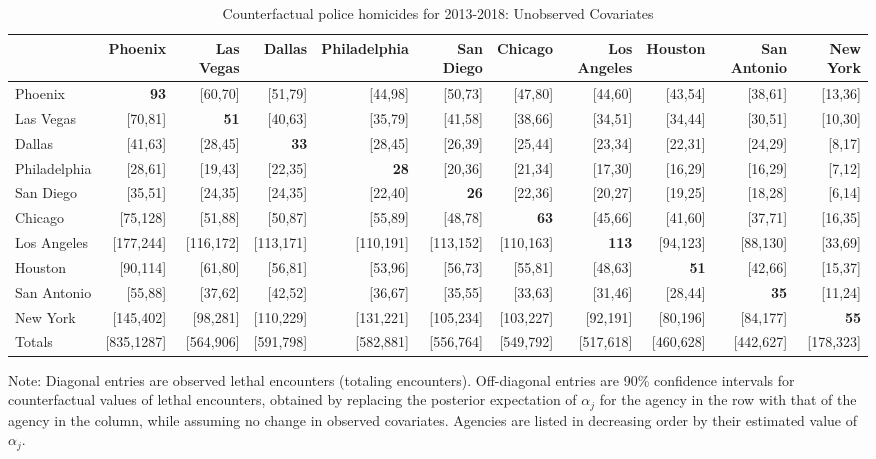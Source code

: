 \begin{table}[h!]\centering\scriptsize\tabcolsep=0.1cm\caption{Counterfactual police homicides for 2013-2018: Unobserved Covariates} \label{table:bootstrap_counterfactual_unobs}\begin{tabular}{lrrrrrrrrrr}\hline \hline&Phoenix&Las Vegas&Dallas&Philadelphia&San Diego&Chicago&Los Angeles&Houston&San Antonio&New York\\
\hline
Phoenix&\textbf{93}&[60,70]&[51,79]&[44,98]&[50,73]&[47,80]&[44,60]&[43,54]&[38,61]&[13,36]\\
Las Vegas&[70,81]&\textbf{51}&[40,63]&[35,79]&[41,58]&[38,66]&[34,51]&[34,44]&[30,51]&[10,30]\\
Dallas&[41,63]&[28,45]&\textbf{33}&[28,45]&[26,39]&[25,44]&[23,34]&[22,31]&[24,29]&[8,17]\\
Philadelphia&[28,61]&[19,43]&[22,35]&\textbf{28}&[20,36]&[21,34]&[17,30]&[16,29]&[16,29]&[7,12]\\
San Diego&[35,51]&[24,35]&[24,35]&[22,40]&\textbf{26}&[22,36]&[20,27]&[19,25]&[18,28]&[6,14]\\
Chicago&[75,128]&[51,88]&[50,87]&[55,89]&[48,78]&\textbf{63}&[45,66]&[41,60]&[37,71]&[16,35]\\
Los Angeles&[177,244]&[116,172]&[113,171]&[110,191]&[113,152]&[110,163]&\textbf{113}&[94,123]&[88,130]&[33,69]\\
Houston&[90,114]&[61,80]&[56,81]&[53,96]&[56,73]&[55,81]&[48,63]&\textbf{51}&[42,66]&[15,37]\\
San Antonio&[55,88]&[37,62]&[42,52]&[36,67]&[35,55]&[33,63]&[31,46]&[28,44]&\textbf{35}&[11,24]\\
New York&[145,402]&[98,281]&[110,229]&[131,221]&[105,234]&[103,227]&[92,191]&[80,196]&[84,177]&\textbf{55}\\
\hline
Totals&[835,1287]&[564,906]&[591,798]&[582,881]&[556,764]&[549,792]&[517,618]&[460,628]&[442,627]&[178,323]\\
\hline\end{tabular}\begin{center}\begin{minipage}{1.05\textwidth} %
 {\footnotesize {\schape Note}: Diagonal entries are observed lethal encounters (totaling \totalincidentsten{} encounters). Off-diagonal entries are 90\% confidence intervals for counterfactual values of lethal encounters, obtained by replacing the posterior expectation of $\alpha_j$ for the agency in the row with that of the agency in the column, while assuming no change in observed covariates. Agencies are listed in decreasing order by their estimated value of $\alpha_j$.} 
 \end{minipage} 
 \end{center} 
 \end{table} 
